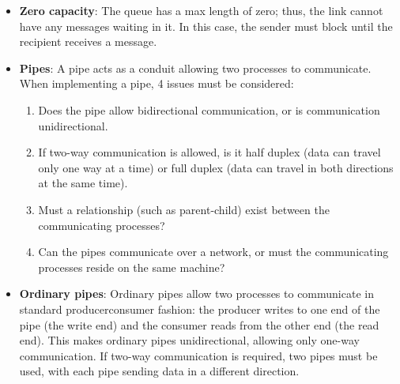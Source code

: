 \documentclass{report}
\begin{document}
\begin{itemize}
            \begin{itemize}
                \item \textbf{Blocking send}: The sending process is blocked until the message is received by the receiving process or by the mailbox.
                \item \textbf{Nonblocking send}: The sending process sends the message and resumes operation.
                \item \textbf{Blocking receive}: The receiver blocks until a message is available.
                \item \textbf{Nonblocking receive}: The receiver retrieves either a valid message or null.
            \end{itemize}
        \item \textbf{Zero capacity}: The queue has a max length of zero; thus, the link cannot have any messages waiting in it. In this case, the sender must block until the recipient receives a message.
        \item \textbf{Pipes}: A pipe acts as a conduit allowing two processes to communicate. 
            \bigbreak \noindent 
            When implementing a pipe, 4 issues must be considered:
            \begin{enumerate}
                \item Does the pipe allow bidirectional communication, or is communication unidirectional.
                \item If two-way communication is allowed, is it half duplex (data can travel only one way at a time) or full duplex (data can travel in both directions at the same time).
                \item Must a relationship (such as parent-child) exist between the communicating processes?
                \item Can the pipes communicate over a network, or must the communicating processes reside on the same machine?
            \end{enumerate}
        \item \textbf{Ordinary pipes}:  Ordinary pipes allow two processes to communicate in standard producerconsumer fashion: the producer writes to one end of the pipe (the write end) and the consumer reads from the other end (the read end). This makes ordinary pipes unidirectional, allowing only one-way communication.
            \bigbreak \noindent 
            If two-way communication is required, two pipes must be used, with each pipe sending data in a different direction.
            \bigbreak \noindent 

\end{itemize}
\end{document}
